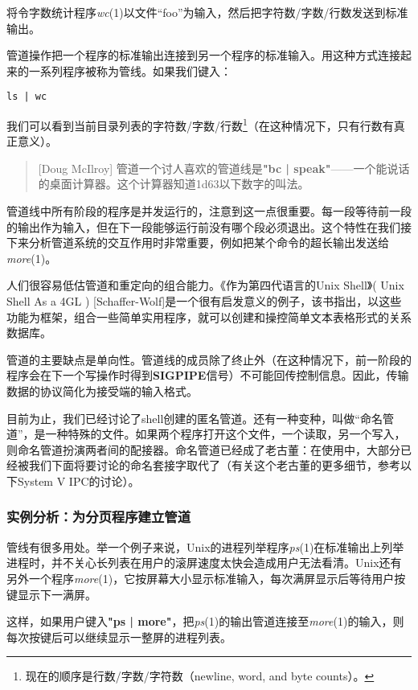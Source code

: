\documentclass[12pt,oneside]{book}
\begin{document}
\begin{common-format}
将令字数统计程序\textit{wc}(1)以文件“foo”为输入，然后把字符数/字数/行数发送到标准输出。

管道操作把一个程序的标准输出连接到另一个程序的标准输入。用这种方式连接起来的一系列程序被称为管线。如果我们键入：
\begin{Verbatim}
ls | wc
\end{Verbatim}


我们可以看到当前目录列表的字符数/字数/行数\footnote{现在的顺序是行数/字数/字符数（newline, word, and byte counts）。}（在这种情况下，只有行数有真正意义）。

\begin{quote}[Doug McIlroy]
管道一个讨人喜欢的管道线是\textbf{"bc | speak"}——一个能说话的桌面计算器。这个计算器知道\num{1d63}以下数字的叫法。
\end{quote}

管道线中所有阶段的程序是并发运行的，注意到这一点很重要。每一段等待前一段的输出作为输入，但在下一段能够运行前没有哪个段必须退出。这个特性在我们接下来分析管道系统的交互作用时非常重要，例如把某个命令的超长输出发送给\textit{more}(1)。

人们很容易低估管道和重定向的组合能力。《作为第四代语言的Unix Shell》( Unix Shell As a 4GL ) [Schaffer-Wolf]是一个很有启发意义的例子，该书指出，以这些功能为框架，组合一些简单实用程序，就可以创建和操控简单文本表格形式的关系数据库。

管道的主要缺点是单向性。管道线的成员除了终止外（在这种情况下，前一阶段的程序会在下一个写操作时得到\textbf{SIGPIPE}信号）不可能回传控制信息。因此，传输数据的协议简化为接受端的输入格式。

目前为止，我们已经讨论了shell创建的匿名管道。还有一种变种，叫做“命名管道”，是一种特殊的文件。如果两个程序打开这个文件，一个读取，另一个写入，则命名管道扮演两者间的配接器。命名管道已经成了老古董：在使用中，大部分已经被我们下面将要讨论的命名套接字取代了（有关这个老古董的更多细节，参考以下System V IPC的讨论）。


\subsubsection{实例分析：为分页程序建立管道}
管线有很多用处。举一个例子来说，Unix的进程列举程序\textit{ps}(1)在标准输出上列举进程时，并不关心长列表在用户的滚屏速度太快会造成用户无法看清。Unix还有另外一个程序\textit{more}(1)，它按屏幕大小显示标准输入，每次满屏显示后等待用户按键显示下一满屏。

这样，如果用户键入\textbf{"ps | more"}，把\textit{ps}(1)的输出管道连接至\textit{more}(1)的输入，则每次按键后可以继续显示一整屏的进程列表。


\end{common-format}
\end{document}
